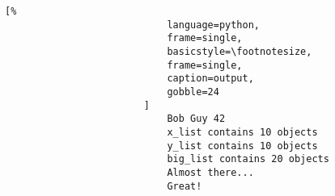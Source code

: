 \documentclass[crop=false,class=book,oneside]{standalone}
\begin{document}
                    \begin{minipage}[t]{0.48\textwidth}
                        \centering
                        \begin{lstlisting}[%
                            language=python,
                            frame=single,
                            basicstyle=\footnotesize,
                            frame=single,
                            caption=output,
                            gobble=24
                        ]
                            Bob Guy 42
                            x_list contains 10 objects
                            y_list contains 10 objects
                            big_list contains 20 objects
                            Almost there...
                            Great!
                        \end{lstlisting}
                    \end{minipage}
                    \newpage
\end{document}
